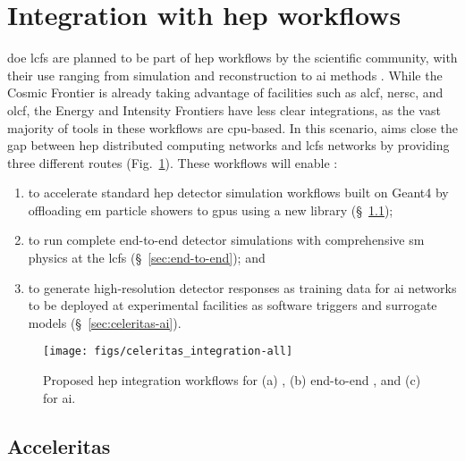 \section{Integration with \ac{hep} workflows}


\ac{doe} \acp{lcf} are planned to be part of \ac{hep} workflows by the
scientific community, with their use ranging from simulation and reconstruction
to \ac{ai} methods \cite{hep-network-requirements}. While the Cosmic Frontier is
already taking advantage of facilities such as \ac{alcf}, \ac{nersc}, and
\ac{olcf}, the Energy and Intensity Frontiers have less clear integrations, as
the vast majority of tools in these workflows are \ac{cpu}-based. In this
scenario, \celeritas aims close the gap between \ac{hep} distributed computing
networks and \acp{lcf} networks by providing three different routes
(Fig.~\ref{fig:celeritas-hep-workflows}). These workflows  will enable
\celeritas:
\begin{enumerate}[itemsep=0pt, label=(\alph*)]
  \item to accelerate standard \ac{hep} detector simulation workflows built on
    Geant4 by offloading \ac{em} particle showers to \acp{gpu} using a new
    \acceleritas library (\S~\ref{sec:acceleritas});
  \item to run complete end-to-end detector simulations with comprehensive
    \ac{sm} physics at the \acp{lcf} (\S~\ref{sec:end-to-end}); and
  \item to generate high-resolution detector responses as training data for
    \ac{ai} networks to be deployed at experimental facilities as software
    triggers and surrogate models (\S~\ref{sec:celeritas-ai}).
\end{enumerate}
\begin{figure}
    \centering
    \texttt{[image: figs/celeritas\_integration-all]}
    \caption{Proposed \acs{hep} integration workflows for (a) \acceleritas, (b)
    end-to-end \celeritas, and (c) \celeritas for \acs{ai}.}
    \label{fig:celeritas-hep-workflows}
\end{figure}

\subsection{Acceleritas}
\label{sec:acceleritas}

